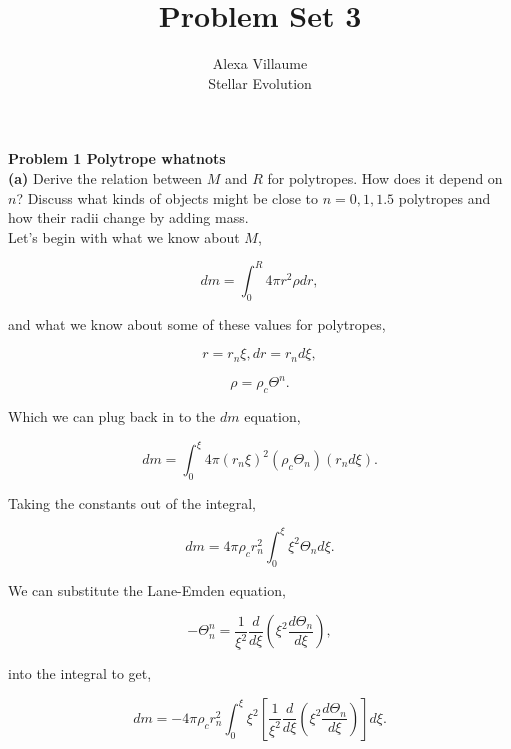 \documentclass[12pt]{article}
\begin{document}
 
 \title{Problem Set 3}
\author{Alexa Villaume\\ 
Stellar Evolution } 
 
\maketitle
 
\noindent \textbf{Problem 1 Polytrope whatnots}\\
\noindent \textbf{(a)} Derive the relation between $M$ and $R$ for polytropes. How does it depend on $n$? Discuss what kinds of objects might be close to $n=0, 1, 1.5$ polytropes and how their radii change by adding mass. \\

\noindent Let's begin with what we know about $M$,

\begin{equation}
dm = \int_0^R 4\pi r^2 \rho dr,
\end{equation}

\noindent and what we know about some of these values for polytropes,

\begin{equation}
r = r_n \xi, dr = r_n d\xi,
\end{equation}

\begin{equation}
\rho = \rho_c \Theta^n.
\end{equation}

\noindent Which we can plug back in to the $dm$ equation,

\begin{equation}
dm = \int_0^\xi 4\pi\left( r_n \xi \right)^2 \left( \rho_c \Theta_n \right) \left( r_n d\xi \right).
\end{equation}

\noindent Taking the constants out of the integral,

\begin{equation}
dm = 4\pi \rho_c r_n^2 \int_0^\xi \xi^2 \Theta_n d\xi.
\end{equation}

\noindent We can substitute the Lane-Emden equation,

\begin{equation}
-\Theta_n^n = \frac{1}{\xi^2}\frac{d}{d\xi}\left(\xi^2 \frac{d\Theta_n}{d\xi} \right),
\end{equation}

\noindent into the integral to get,

\begin{equation}
dm = -4\pi \rho_c r_n^2 \int_0^\xi \xi^2 \left[ \frac{1}{\xi^2} \frac{d}{d\xi} \left( \xi^2 \frac{d\Theta_n}{d\xi} \right) \right] d\xi.
\end{equation}
\end{document}
